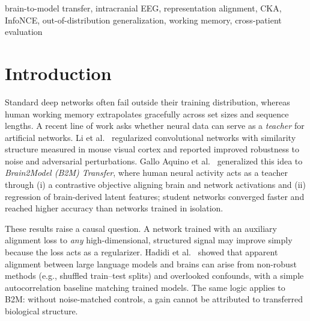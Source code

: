 \documentclass[conference]{IEEEtran}
\begin{document}
\begin{IEEEkeywords}
brain-to-model transfer, intracranial EEG, representation alignment, CKA, InfoNCE, out-of-distribution generalization, working memory, cross-patient evaluation
\end{IEEEkeywords}

\section{Introduction}
Standard deep networks often fail outside their training distribution, whereas human working
memory extrapolates gracefully across set sizes and sequence lengths. A recent line of work
asks whether neural data can serve as a \emph{teacher} for artificial networks.
Li et al.~\cite{li2019brains} regularized convolutional networks with similarity structure
measured in mouse visual cortex and reported improved robustness to noise and adversarial
perturbations. Gallo Aquino et al.~\cite{aquino2025b2m} generalized this idea to \emph{Brain2Model (B2M)
Transfer}, where human neural activity acts as a teacher
through (i) a contrastive objective aligning brain and network activations and (ii) regression of
brain-derived latent features; student networks converged faster and reached higher accuracy than
networks trained in isolation.

These results raise a causal question. A network trained with an auxiliary alignment loss to
\emph{any} high-dimensional, structured signal may improve simply because the loss acts as a
regularizer. Hadidi et al.~\cite{hadidi2026spurious} showed that apparent alignment between large language models and
brains can arise from non-robust methods (e.g., shuffled train--test splits) and overlooked
confounds, with a simple autocorrelation baseline matching trained models. The same logic applies to B2M: without noise-matched controls, a gain
cannot be attributed to transferred biological structure.
\end{document}

